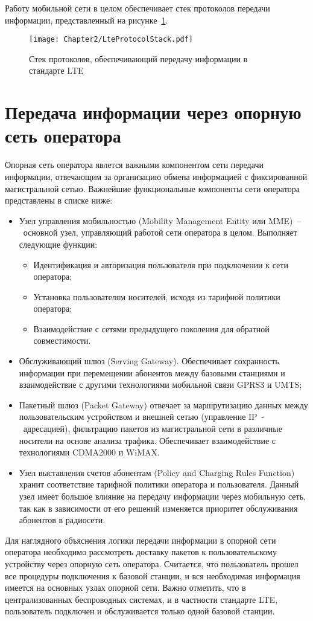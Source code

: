 Работу мобильной сети в целом обеспечивает стек протоколов передачи информации, представленный на рисунке~\ref{fig:LteProtocolStack}.

\begin{figure}[htbp]
\begin{center}
\texttt{[image: Chapter2/LteProtocolStack.pdf]}
\caption{Стек протоколов, обеспечивающий передачу информации в стандарте LTE}
\label{fig:LteProtocolStack}
\end{center}
\end{figure}

\section{Передача информации через опорную сеть оператора}
\label{chap2:CoreNetwork}
Опорная сеть оператора явлется важными компонентом сети передачи информации, отвечающим за организацию обмена информацией с фиксированной магистральной сетью. Важнейшие функциональные компоненты сети оператора представлены в списке ниже:
\begin{itemize}
  \item Узел управления мобильностью (Mobility Management Entity или MME)~--~основной узел, управляющий работой сети оператора в целом. Выполняет следующие функции:
  \begin{itemize}
  	\item Идентификация и авторизация пользователя при подключении к сети оператора;
  	\item Установка пользователям носителей, исходя из тарифной политики оператора;
  	\item Взаимодействие с сетями предыдущего поколения для обратной совместимости.
  \end{itemize}
  \item Обслуживающий шлюз (Serving Gateway). Обеспечивает сохранность информации при перемещении абонентов между базовыми станциями и взаимодействие с другими технологиями мобильной связи GPRS3 и UMTS;
  \item Пакетный шлюз (Packet Gateway) отвечает за маршрутизацию данных между пользовательским устройством и внешней сетью (управление IP~-~адресацией), фильтрацию пакетов из магистральной сети в различные носители на основе анализа трафика. Обеспечивает взаимодействие с технологиями CDMA2000 и WiMAX.
  \item Узел выставления счетов абонентам (Policy and Charging Rules Function) хранит соответствие тарифной политики оператора и пользователя. Данный узел имеет большое влияние на передачу информации через мобильную сеть, так как в зависимости от его решений изменяется приоритет обслуживания абонентов в радиосети.
\end{itemize}
Для наглядного объяснения логики передачи информации в опорной сети оператора необходимо рассмотреть доставку пакетов к пользовательскому устройству через опорную сеть оператора. Считается, что пользователь прошел все процедуры подключения к базовой станции, и вся необходимая информация имеется на основных узлах опорной сети. Важно отметить, что в централизованных беспроводных системах, и в частности стандарте LTE, пользователь подключен и обслуживается только одной базовой станции.

